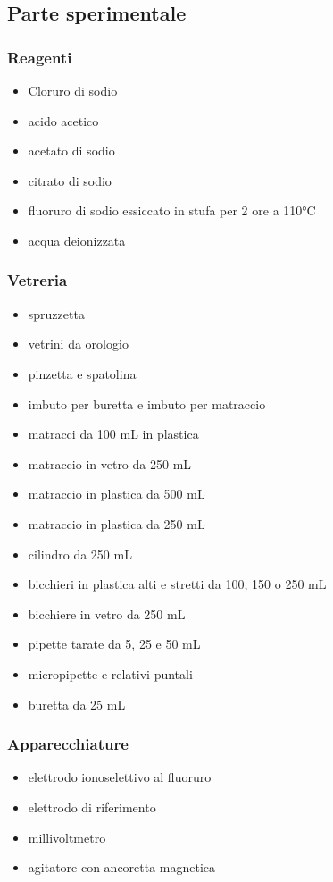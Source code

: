 \subsection{Parte sperimentale}

\subsubsection{Reagenti}
\begin{itemize}
\item Cloruro di sodio
\item acido acetico
\item acetato di sodio
\item citrato di sodio
\item fluoruro di sodio essiccato in stufa per 2 ore a 110°C
\item acqua deionizzata
\end{itemize}

\subsubsection{Vetreria}
\begin{itemize}
\item spruzzetta
\item vetrini da orologio
\item pinzetta e spatolina
\item imbuto per buretta e imbuto per matraccio
\item matracci da 100 mL in plastica
\item matraccio in vetro da 250 mL
\item matraccio in plastica da 500 mL
\item matraccio in plastica da 250 mL
\item cilindro da 250 mL
\item bicchieri in plastica alti e stretti da 100, 150 o 250 mL
\item bicchiere in vetro da 250 mL
\item pipette tarate da 5, 25 e 50 mL
\item micropipette e relativi puntali
\item buretta da 25 mL
\end{itemize}

\subsubsection{Apparecchiature}
\begin{itemize}
\item elettrodo ionoselettivo al fluoruro
\item elettrodo di riferimento
\item millivoltmetro
\item agitatore con ancoretta magnetica
\end{itemize}

